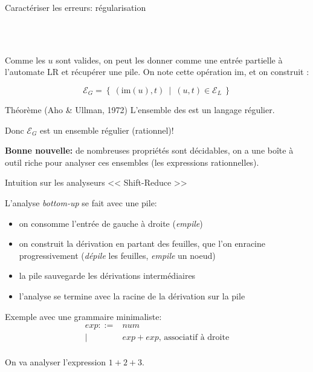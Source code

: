 \documentclass{beamer}          %
\begin{document}
\begin{frame}[t]{Caractériser les erreurs: régularisation}

 \  \\
 \

  Comme les $u$ sont valides, on peut les donner comme une entrée partielle à l'automate LR et récupérer une pile. On note cette opération $\text{im}$, et on construit :

  $$
  \mathcal E_G = \left\{\ (\text{im}(u), t)\ \mid\ (u, t) \in \mathcal E_L\ \right\}
  $$

  \pause
  \begin{block}{Théorème (Aho \& Ullman, 1972)}
  L'ensemble des  est un langage régulier.  \\
  \end{block}

  \pause
  \pause

  Donc $\mathcal E_G$ est un ensemble régulier (rationnel)!

  \textbf{Bonne nouvelle:} de nombreuses propriétés sont décidables, on
  a une boîte à outil riche pour analyser ces ensembles (les expressions
  rationnelles).

\end{frame}

\begin{frame}{Intuition sur les analyseurs << Shift-Reduce >>}

  L'analyse {\em bottom-up} se fait avec une pile:
  \begin{itemize}
    \item on consomme l'entrée de gauche à droite ({\em empile})
    \item on construit la dérivation en partant des feuilles,
          que l'on enracine progressivement ({\em dépile} les feuilles, {\em empile} un noeud)
    \item la pile sauvegarde les dérivations intermédiaires
    \item l'analyse se termine avec la racine de la dérivation sur la pile
  \end{itemize}

  \pause

  Exemple avec une grammaire minimaliste:
  $$
  \begin{array}{rl}
    exp ::= & num \\
          | & exp + exp \text{, associatif à droite}\\
  \end{array}
  $$

  On va analyser l'expression $1+2+3$.
\end{frame}
\end{document}
